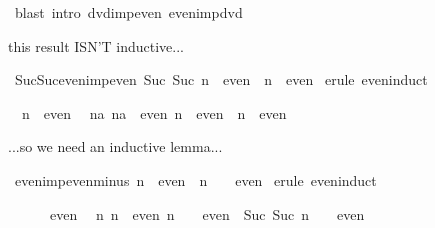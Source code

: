 \begin{isabellebody}
\isamarkupfalse%
\ {\isacharparenleft}blast\ intro{\isacharcolon}\ dvd{\isacharunderscore}imp{\isacharunderscore}even\ even{\isacharunderscore}imp{\isacharunderscore}dvd{\isacharparenright}\isamarkupfalse%
%
\begin{isamarkuptext}%
this result ISN'T inductive...%
\end{isamarkuptext}%
\isamarkuptrue%
\ Suc{\isacharunderscore}Suc{\isacharunderscore}even{\isacharunderscore}imp{\isacharunderscore}even{\isacharcolon}\ {\isachardoublequote}Suc\ {\isacharparenleft}Suc\ n{\isacharparenright}\ {\isasymin}\ even\ {\isasymLongrightarrow}\ n\ {\isasymin}\ even{\isachardoublequote}\isanewline
\isamarkupfalse%
\ {\isacharparenleft}erule\ even{\isachardot}induct{\isacharparenright}\isamarkupfalse%
%
\begin{isamarkuptxt}%
\begin{isabelle}%
\ {}{\isachardot}\ n\ {\isasymin}\ even\isanewline
\ {}{\isachardot}\ {\isasymAnd}na{\isachardot}\ {\isasymlbrakk}na\ {\isasymin}\ even{\isacharsemicolon}\ n\ {\isasymin}\ even{\isasymrbrakk}\ {\isasymLongrightarrow}\ n\ {\isasymin}\ even%
\end{isabelle}%
\end{isamarkuptxt}%
\isamarkuptrue%
\isamarkupfalse%
%
\begin{isamarkuptext}%
...so we need an inductive lemma...%
\end{isamarkuptext}%
\isamarkuptrue%
\ even{\isacharunderscore}imp{\isacharunderscore}even{\isacharunderscore}minus{\isacharunderscore}{}{\isacharcolon}\ {\isachardoublequote}n\ {\isasymin}\ even\ {\isasymLongrightarrow}\ n\ {\isacharminus}\ {}\ {\isasymin}\ even{\isachardoublequote}\isanewline
\isamarkupfalse%
\ {\isacharparenleft}erule\ even{\isachardot}induct{\isacharparenright}\isamarkupfalse%
%
\begin{isamarkuptxt}%
\begin{isabelle}%
\ {}{\isachardot}\ {}\ {\isacharminus}\ {}\ {\isasymin}\ even\isanewline
\ {}{\isachardot}\ {\isasymAnd}n{\isachardot}\ {\isasymlbrakk}n\ {\isasymin}\ even{\isacharsemicolon}\ n\ {\isacharminus}\ {}\ {\isasymin}\ even{\isasymrbrakk}\ {\isasymLongrightarrow}\ Suc\ {\isacharparenleft}Suc\ n{\isacharparenright}\ {\isacharminus}\ {}\ {\isasymin}\ even%
\end{isabelle}%
\end{isamarkuptxt}%

\end{isabellebody}
